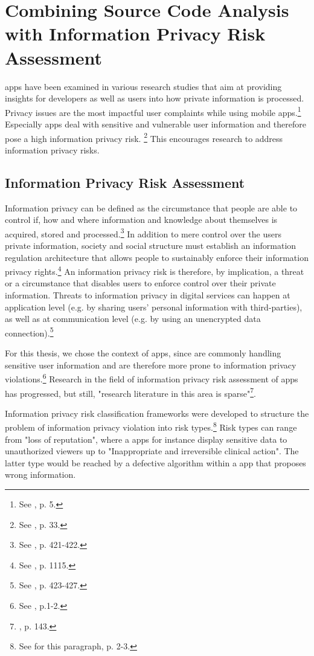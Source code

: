 \section{Combining Source Code Analysis with Information Privacy Risk Assessment}

\mH apps have been examined in various research studies that aim at providing insights for developers as well as users into how private information is processed.
Privacy issues are the most impactful user complaints while using mobile apps.\footnote{See \cite{Khalid2015}, p. 5.}
Especially \mH apps deal with sensitive and vulnerable user information and therefore pose a high information privacy risk. \footnote{See \cite{Kumar2013}, p. 33.}
This encourages research to address information privacy risks.

\subsection{Information Privacy Risk Assessment}

Information privacy can be defined as the circumstance that people are able to control if, how and where information and knowledge about themselves is acquired, stored and processed.\footnote{See \cite{Fischer1998}, p. 421-422.}
In addition to mere control over the users private information, society and social structure must establish an information regulation architecture that allows people to sustainably enforce their information privacy rights.\footnote{See \cite{Solove2002}, p. 1115.}
An information privacy risk is therefore, by implication, a threat or a circumstance that disables users to enforce control over their private information.
Threats to information privacy in digital services can happen at application level (e.g. by sharing users' personal information with third-parties), as well as at communication level (e.g. by using an unencrypted data connection).\footnote{See \cite{Fischer1998}, p. 423-427.}

For this thesis, we chose the context of \mH apps, since \mH are commonly handling sensitive user information and are therefore more prone to information privacy violations.\footnote{See \cite{Huckvale2015}, p.1-2.}
Research in the field of information privacy risk assessment of \mH apps has progressed, but still, "research literature in this area is sparse"\footnote{\cite{Arora2014}, p. 143.}.

Information privacy risk classification frameworks were developed to structure the problem of information privacy violation into risk types.\footnote{See for this paragraph\cite{Lewis2014}, p. 2-3.}
Risk types can range from "loss of reputation", where a \mH apps for instance display sensitive data to unauthorized viewers up to "Inappropriate and irreversible clinical action". 
The latter type would be reached by a defective algorithm within a \mH app that proposes wrong information.

